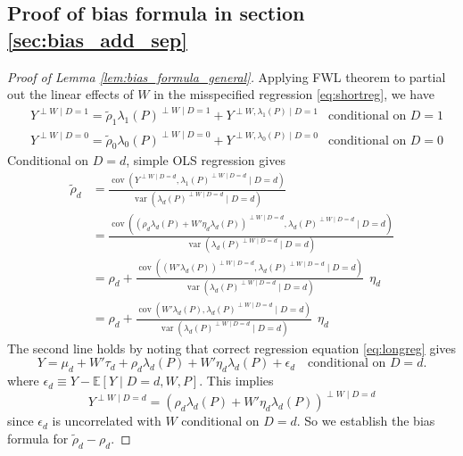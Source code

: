 \documentclass[11pt]{article}
\theoremstyle{definition}
\DeclareMathOperator{\cov}{cov}
\DeclareMathOperator{\var}{var}
\newcommand{\Exp}{\ensuremath{\mathbb{E}}} %
\newcommand{\0}{\ensuremath{\mathbf{0}}}
\begin{document}
\begin{bibunit}
\clearpage

%
\subsection{Proof of bias formula in section \ref{sec:bias_add_sep}}

%
\begin{proof}[Proof of Lemma \ref{lem:bias_formula_general}]
Applying FWL theorem to partial out the linear effects of $W$ in the misspecified regression \eqref{eq:shortreg}, we have
\begin{align*}
    &Y^{\perp W\mid D=1} = \tilde{\rho}_1 \lambda_1(P)^{\perp W\mid D=1} + Y^{\perp W, \lambda_1(P)\mid D=1}  &\text{conditional on } D = 1\\
    &Y^{\perp W\mid D=0} = \tilde{\rho}_0 \lambda_0(P)^{\perp W\mid D=0} + Y^{\perp W, \lambda_0(P)\mid D=0} &\text{conditional on } D = 0
\end{align*}
Conditional on $D=d$, simple OLS regression gives 
\begin{align*}
    \tilde{\rho}_d
    &= \frac{\cov(Y^{\perp W\mid D=d}, \lambda_1(P)^{\perp W\mid D=d}\mid D=d)}{\var(\lambda_d(P)^{\perp W\mid D=d}\mid D=d)} \\
    &= \frac{\cov((\rho_d \lambda_d(P) + W'\eta_d \lambda_d(P))^{\perp W\mid D=d}, \lambda_d(P)^{\perp W\mid D=d}\mid D=d)}{\var(\lambda_d(P)^{\perp W\mid D=d}\mid D=d)} \\
    &= \rho_d + \frac{\cov((W'\lambda_d(P))^{\perp W\mid D=d}, \lambda_d(P)^{\perp W\mid D=d} \mid D=d)}{\var(\lambda_d(P)^{\perp W\mid D=d}\mid D=d)} ~~\eta_d \\
    &= \rho_d + 
    \frac{\cov(W'\lambda_d(P), \lambda_d(P)^{\perp W\mid D=d} \mid D=d)}{\var(\lambda_d(P)^{\perp W\mid D=d}\mid D=d)} ~~\eta_d 
\end{align*}
The second line holds by noting that correct regression equation \eqref{eq:longreg} gives
\[
    Y = \mu_d + W'\tau_d + \rho_d \lambda_d(P) + W'\eta_d \lambda_d(P) + \epsilon_d \quad \text{conditional on } D = d.
\]
where $\epsilon_d \equiv Y - \Exp[Y\mid D=d, W, P]$. This implies 
\[
    Y^{\perp W\mid D=d} = \left(\rho_d \lambda_d(P) + W'\eta_d \lambda_d(P)\right)^{\perp W\mid D=d}
\]
since $\epsilon_d$ is uncorrelated with $W$ conditional on $D=d$. So we  establish the bias formula for $\tilde{\rho}_d - \rho_d$.


\end{proof}
\end{bibunit}
\end{document}
